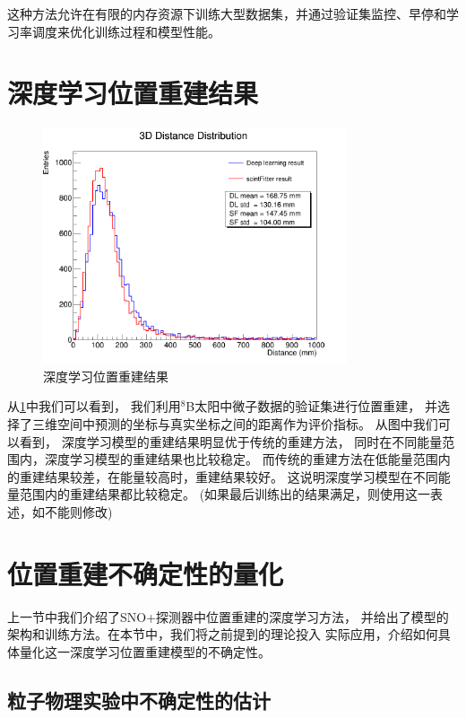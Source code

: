 这种方法允许在有限的内存资源下训练大型数据集，并通过验证集监控、早停和学习率调度来优化训练过程和模型性能。

\section{深度学习位置重建结果}

\begin{figure}[htbp]
    \centering
    \includegraphics[width=0.8\textwidth]{figures/distance_distribution_comp.png}
    \caption{深度学习位置重建结果}
    \label{fig:position_reconstruction}
\end{figure}

从\ref{fig:position_reconstruction}中我们可以看到，
我们利用${}^{8}$B太阳中微子数据的验证集进行位置重建，
并选择了三维空间中预测的坐标与真实坐标之间的距离作为评价指标。
从图中我们可以看到，
深度学习模型的重建结果明显优于传统的重建方法，
同时在不同能量范围内，深度学习模型的重建结果也比较稳定。
而传统的重建方法在低能量范围内的重建结果较差，在能量较高时，重建结果较好。
这说明深度学习模型在不同能量范围内的重建结果都比较稳定。 
(如果最后训练出的结果满足，则使用这一表述，如不能则修改) 

\section{位置重建不确定性的量化}\label{sec:uncertainty}

上一节中我们介绍了SNO+探测器中位置重建的深度学习方法，
并给出了模型的架构和训练方法。在本节中，我们将之前提到的理论投入
实际应用，介绍如何具体量化这一深度学习位置重建模型的不确定性。

\subsection{粒子物理实验中不确定性的估计}

